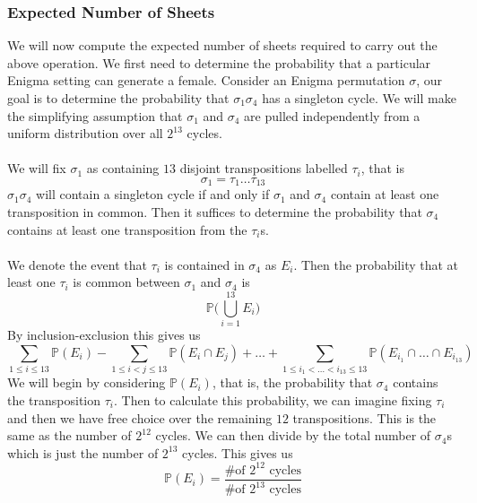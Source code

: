 \subsubsection{Expected Number of Sheets}
We will now compute the expected number of sheets required to carry
out the above operation. We first need to determine the probability
that a particular Enigma setting can generate a female. Consider an
Enigma permutation $\sigma$, our goal is to determine the probability
that $\sigma_1\sigma_4$ has a singleton cycle. We will make the
simplifying assumption that $\sigma_1$ and $\sigma_4$ are pulled
independently from a uniform distribution over all $2^{13}$ cycles.
\\\\We will fix $\sigma_1$ as containing $13$ disjoint transpositions
labelled $\tau_i$, that is
\[
  \sigma_1 = \tau_1\dots\tau_{13}
\]
$\sigma_1\sigma_4$ will contain a singleton cycle if and only if
$\sigma_1$ and $\sigma_4$ contain at least one transposition in
common. Then it suffices to determine the probability that $\sigma_4$
contains at least one transposition from the $\tau_i$s.
\\\\We denote the event that $\tau_i$ is contained in $\sigma_4$ as
$E_i$. Then the probability that at least one $\tau_i$ is common
between $\sigma_1$ and $\sigma_4$ is
\[
  \mathbb{P}\biggl(\bigcup_{i=1}^{13}E_i\biggr)
\]
By inclusion-exclusion this gives us
\[
  \sum_{1 \le i \le 13}\mathbb{P}(E_i) - \sum_{1\le i < j \le
  13}\mathbb{P}(E_i\cap E_j) + \dots + \sum_{1\le i_1 < \dots <
  i_{13} \le 13}\mathbb{P}(E_{i_1}\cap\dots\cap E_{i_{13}})
\]
We will begin by considering $\mathbb{P}(E_i)$, that is, the
probability that $\sigma_4$ contains the transposition $\tau_i$. Then
to calculate this probability, we can imagine fixing $\tau_i$ and
then we have free choice over the remaining $12$ transpositions. This
is the same as the number of $2^{12}$ cycles. We can then divide by
the total number of $\sigma_4$s which is just the number of $2^{13}$
cycles. This gives us
\[
  \mathbb{P}(E_i) = \frac{\text{\# of }2^{12}\text{ cycles}}{\text{\#
  of }2^{13}\text{ cycles}}
\]
